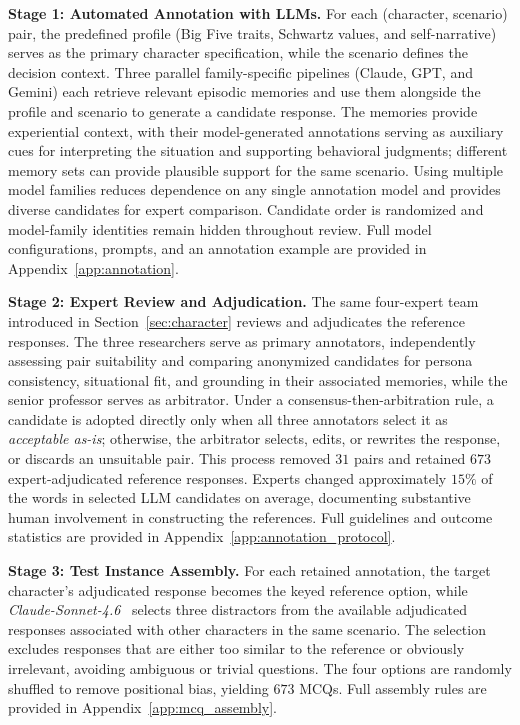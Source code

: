 \documentclass[11pt]{article}
\begin{document}
\textbf{Stage 1: Automated Annotation with LLMs.}
For each (character, scenario) pair, the predefined profile (Big Five traits, Schwartz values, and self-narrative) serves as the primary character specification, while the scenario defines the decision context. Three parallel family-specific pipelines (Claude, GPT, and Gemini) each retrieve relevant episodic memories and use them alongside the profile and scenario to generate a candidate response. The memories provide experiential context, with their model-generated annotations serving as auxiliary cues for interpreting the situation and supporting behavioral judgments; different memory sets can provide plausible support for the same scenario. Using multiple model families reduces dependence on any single annotation model and provides diverse candidates for expert comparison. Candidate order is randomized and model-family identities remain hidden throughout review. Full model configurations, prompts, and an annotation example are provided in Appendix~\ref{app:annotation}.

\textbf{Stage 2: Expert Review and Adjudication.}
The same four-expert team introduced in Section~\ref{sec:character} reviews and adjudicates the reference responses. The three researchers serve as primary annotators, independently assessing pair suitability and comparing anonymized candidates for persona consistency, situational fit, and grounding in their associated memories, while the senior professor serves as arbitrator. Under a consensus-then-arbitration rule, a candidate is adopted directly only when all three annotators select it as \textit{acceptable as-is}; otherwise, the arbitrator selects, edits, or rewrites the response, or discards an unsuitable pair. This process removed $31$ pairs and retained $673$ expert-adjudicated reference responses. Experts changed approximately $15\%$ of the words in selected LLM candidates on average, documenting substantive human involvement in constructing the references. Full guidelines and outcome statistics are provided in Appendix~\ref{app:annotation_protocol}.

\textbf{Stage 3: Test Instance Assembly.}
For each retained annotation, the target character's adjudicated response becomes the keyed reference option, while \textit{Claude-Sonnet-4.6}~\cite{anthropic2026sonnet46} selects three distractors from the available adjudicated responses associated with other characters in the same scenario. The selection excludes responses that are either too similar to the reference or obviously irrelevant, avoiding ambiguous or trivial questions. The four options are randomly shuffled to remove positional bias, yielding $673$ MCQs. Full assembly rules are provided in Appendix~\ref{app:mcq_assembly}.
\end{document}
